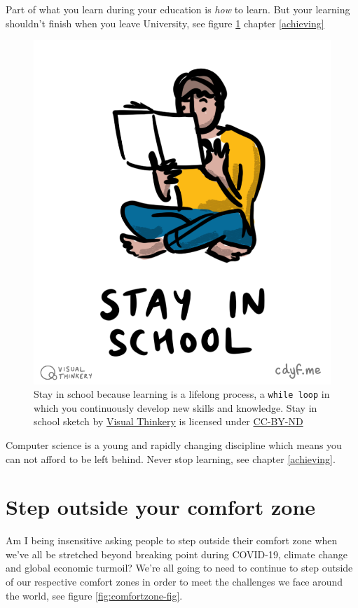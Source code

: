 \documentclass[
]{book}
\begin{document}
Part of what you learn during your education is \emph{how} to learn. But your learning shouldn't finish when you leave University, see figure \ref{fig:stayinschool-fig} chapter \ref{achieving}

\begin{figure}

{\centering \includegraphics[width=0.5\linewidth]{images/Stay in school} 

}

\caption{Stay in school because learning is a lifelong process, a \texttt{while\ loop} in which you continuously develop new skills and knowledge. Stay in school sketch by \href{https://visualthinkery.com}{Visual Thinkery} is licensed under \href{https://creativecommons.org/licenses/by-nd/4.0/}{CC-BY-ND}}\label{fig:stayinschool-fig}
\end{figure}



Computer science is a young and rapidly changing discipline which means you can not afford to be left behind. Never stop learning, see chapter \ref{achieving}.

\hypertarget{comfy}{%
\section{Step outside your comfort zone}\label{comfy}}

Am I being insensitive asking people to step outside their comfort zone when we've all be stretched beyond breaking point during COVID-19, climate change and global economic turmoil? We're all going to need to continue to step outside of our respective comfort zones in order to meet the challenges we face around the world, see figure \ref{fig:comfortzone-fig}.
\end{document}
